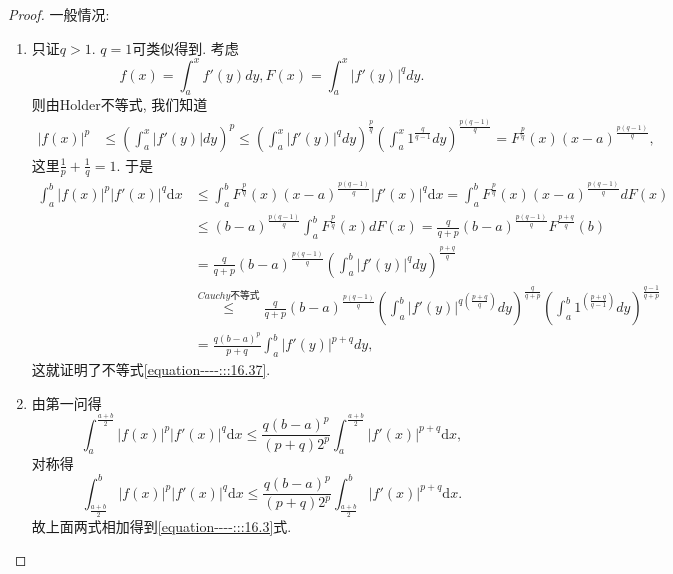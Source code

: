\documentclass[../../main.tex]{subfiles}
\begin{document}
\begin{proof}
{\heiti 一般情况:}
\begin{enumerate}
\item 只证\(q>1\). \(q = 1\)可类似得到. 考虑
\[f(x)=\int_{a}^{x}f'(y)dy, F(x)=\int_{a}^{x}|f'(y)|^{q}dy.\]
则由Holder不等式, 我们知道
\begin{align*}
|f(x)|^{p}&\leqslant \left(\int_{a}^{x}|f'(y)|dy\right)^{p} \leqslant \left(\int_{a}^{x}|f'(y)|^{q}dy\right)^{\frac{p}{q}}\left(\int_{a}^{x}1^{\frac{q}{q - 1}}dy\right)^{\frac{p(q - 1)}{q}} = F^{\frac{p}{q}}(x)(x - a)^{\frac{p(q - 1)}{q}},
\end{align*}
这里\(\frac{1}{p}+\frac{1}{q}=1\).
于是
\begin{align*}
\int_{a}^{b}|f(x)|^{p}|f'(x)|^{q}\mathrm{d}x &\leqslant \int_{a}^{b}F^{\frac{p}{q}}(x)(x - a)^{\frac{p(q - 1)}{q}}|f'(x)|^{q}\mathrm{d}x = \int_{a}^{b}F^{\frac{p}{q}}(x)(x - a)^{\frac{p(q - 1)}{q}}dF(x)\\
&\leqslant (b - a)^{\frac{p(q - 1)}{q}}\int_{a}^{b}F^{\frac{p}{q}}(x)dF(x) = \frac{q}{q + p}(b - a)^{\frac{p(q - 1)}{q}}F^{\frac{p + q}{q}}(b)\\
&=\frac{q}{q + p}(b - a)^{\frac{p(q - 1)}{q}}\left(\int_{a}^{b}|f'(y)|^{q}dy\right)^{\frac{p + q}{q}}\\
&\stackrel{Cauchy\text{不等式}}{\leqslant} \frac{q}{q + p}(b - a)^{\frac{p(q - 1)}{q}}\left(\int_{a}^{b}|f'(y)|^{q(\frac{p + q}{q})}dy\right)^{\frac{q}{q + p}}\left(\int_{a}^{b}1^{(\frac{p + q}{q - 1})}dy\right)^{\frac{q - 1}{q + p}}\\
&=\frac{q(b - a)^{p}}{p + q}\int_{a}^{b}|f'(y)|^{p + q}dy,
\end{align*}
这就证明了不等式\eqref{equation----:::16.37}.

\item 由第一问得
\[\int_{a}^{\frac{a + b}{2}}|f(x)|^{p}|f'(x)|^{q}\mathrm{d}x \leqslant \frac{q(b - a)^{p}}{(p + q)2^{p}}\int_{a}^{\frac{a + b}{2}}|f'(x)|^{p + q}\mathrm{d}x,\]
对称得
\[\int_{\frac{a + b}{2}}^{b}|f(x)|^{p}|f'(x)|^{q}\mathrm{d}x \leqslant \frac{q(b - a)^{p}}{(p + q)2^{p}}\int_{\frac{a + b}{2}}^{b}|f'(x)|^{p + q}\mathrm{d}x.\] 
故上面两式相加得到\eqref{equation----:::16.3}式.
\end{enumerate}
\end{proof}
\end{document}
